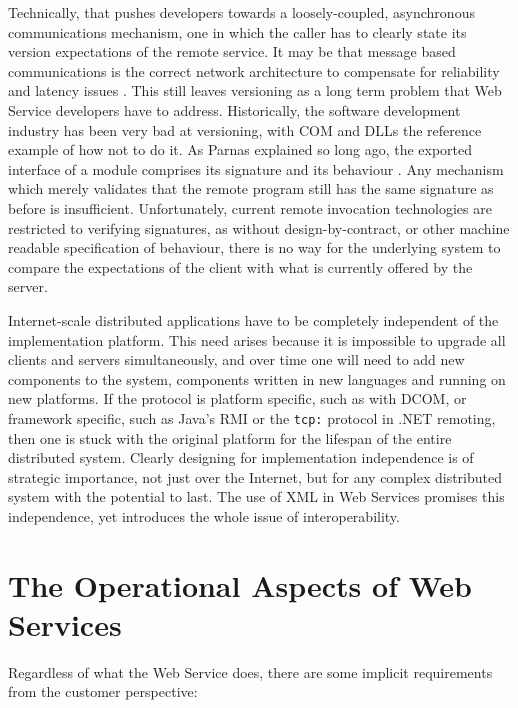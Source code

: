 \documentclass[draft]{report}
\begin{document}
Technically, that pushes developers towards a loosely-coupled,
asynchronous communications mechanism, one in which the caller has to
clearly state its version expectations of the remote service. It may be
that message based communications is the correct network architecture to
compensate for reliability and latency issues \cite{spec:gxa}. This
still leaves versioning as a long term problem that Web Service
developers have to address. Historically, the software development
industry has been very bad at versioning, with COM and DLLs the
reference example of how not to do it. As Parnas explained so long ago,
the exported interface of a module comprises its signature and its
behaviour \cite{parnas:interfaces}. Any mechanism which merely validates
that the remote program still has the same signature as before is
insufficient. Unfortunately, current remote invocation technologies are
restricted to verifying signatures, as without design-by-contract, or
other machine readable specification of behaviour, there is no way for
the underlying system to compare the expectations of the client with
what is currently offered by the server.

Internet-scale distributed applications have to be completely
independent of the implementation platform. This need arises because it
is impossible to upgrade all clients and servers simultaneously, and
over time one will need to add new components to the system, components
written in new languages and running on new platforms. If the protocol
is platform specific, such as with DCOM, or framework specific, such as
Java's RMI or the \verb$tcp:$ protocol in .NET remoting, then one is
stuck with the original platform for the lifespan of the entire
distributed system. Clearly designing for implementation independence is
of strategic importance, not just over the Internet, but for any complex
distributed system with the potential to last. The use of XML in Web
Services promises this independence, yet introduces the whole issue of
interoperability.

\section{The Operational Aspects of Web Services}

Regardless of what the Web Service does, there are some implicit
requirements from the customer perspective:
\end{document}
